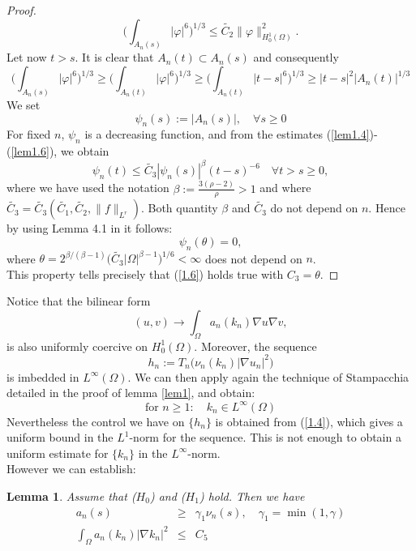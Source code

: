 \documentclass{elsart}
\newtheorem{lemm}[defi]{Lemma}
\begin{document}
\begin{proof}
\begin{equation}
\big( \int_{A_n(s)} |\varphi|^6\big)^{1/3} \leq \tilde{C_2} 
\|\varphi\|_{H^1_0(\Omega)}^2. \label{lem1.5}
\end{equation}
Let now $t > s$. It is clear that $A_n(t) \subset A_n(s)$ and
consequently 
\begin{equation}
\big( \int_{A_n(s)} |\varphi|^6\big)^{1/3} \geq 
\big( \int_{A_n(t)} |\varphi|^6\big)^{1/3} \geq 
\big( \int_{A_n(t)} |t-s|^6\big)^{1/3} \geq 
|t-s|^2 \big|A_n(t)\big|^{1/3} \label{lem1.6}
\end{equation}
We set 
$$\psi_n(s) := \big|A_n(s)\big|, \quad \forall s \geq 0$$
For fixed $n$, $\psi_n$ is a decreasing function, and from the
estimates (\ref{lem1.4})-(\ref{lem1.6}), we obtain 
$$\psi_n(t) \leq \tilde{C_3}|\psi_n(s)|^{\beta}(t-s)^{-6} \quad 
\forall t > s \geq 0,$$
where we have used the notation $\beta:=\frac{3(\rho-2)}{\rho} > 1$ and where  $\tilde{C_3}=\tilde{C_3}(\tilde{C_1},\tilde{C_2},\|f\|_{L^r})$. Both quantity $\beta$ and $\tilde{C_3}$ do not depend on $n$. 
Hence by using Lemma 4.1 in \cite{stam} it follows: 
$$\psi_n(\theta) = 0,$$
where $\theta=2^{\beta/(\beta -1)}\big(\tilde{C_3}|\Omega|^{\beta-1}\big)^{1/6} < \infty$ 
does not depend on $n$. \\ 
This property tells precisely that (\ref{1.6}) holds true with 
$C_3=\theta$.
\end{proof}

Notice that the bilinear form 
$$(u,v) \to \int_{\Omega} a_n(k_n) \nabla u \nabla v,$$
is also uniformly coercive on $H^1_0(\Omega)$. Moreover, the sequence 
$$h_n := T_n\big(\nu_n(k_n)| \nabla u_n|^2 \big)$$ 
is imbedded in $L^{\infty}(\Omega)$. We can then apply again the 
technique of Stampacchia detailed in the proof of lemma \ref{lem1},
and obtain: 
\begin{equation}
\text{for } n \geq 1: \quad k_n \in L^{\infty}(\Omega) \label{1.7}
\end{equation}
Nevertheless the control we have on $\{h_n\}$ is obtained from 
(\ref{1.4}), which gives a uniform bound in the $L^1$-norm for 
the sequence. This is not enough to obtain a uniform estimate for 
$\{k_n\}$ in the $L^{\infty}$-norm. \\ 
However we can establish: 

\begin{lemm}\label{lem2}  
Assume that ($H_0$) and ($H_1$) hold. Then we have 
\begin{eqnarray}
a_n(s) &\geq& \gamma_1 \nu_n(s), \quad \gamma_1=\min(1,\gamma)
\label{1.8'} \\ 
\int_{\Omega} a_n(k_n)|\nabla k_n|^2 &\leq& C_5 \label{1.8}
\end{eqnarray}
\end{lemm}
\end{document}
